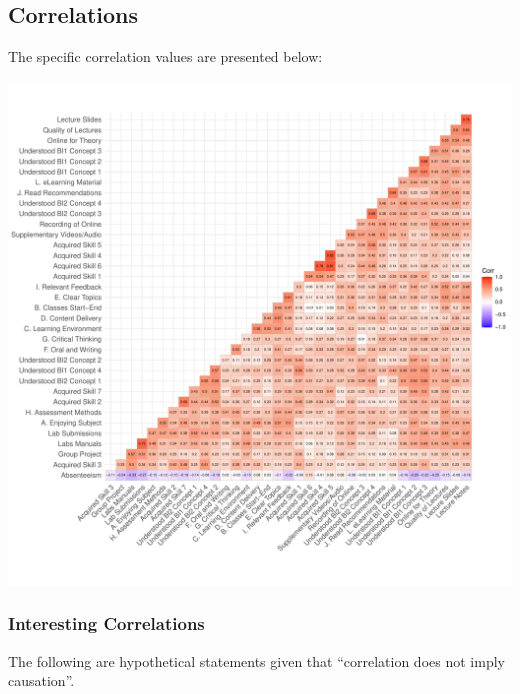 \documentclass[
]{article}
\begin{document}
\newpage

\subsection{Correlations}\label{correlations}

The specific correlation values are presented below:

\includegraphics{10.b.BBT4206-End-SemesterCourseEvaluation-20230821-20231128-BI2-BBIT4-2_files/figure-latex/CorrelationMatrixWithFigures-1.pdf}

\subsubsection{Interesting Correlations}\label{interesting-correlations}

The following are hypothetical statements given that ``correlation does
not imply causation''.
\end{document}

